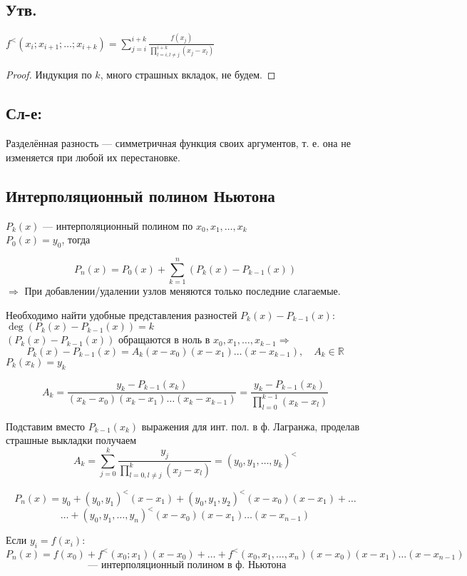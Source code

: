 \subsection*{Утв.}
$f^{<}(x_i; x_{i+1}; \ldots; x_{i+k}) = \sum_{j=i}^{i+k} \frac{f(x_j)}{\prod_{l = i, l \neq j}^{i+k} (x_j - x_l)}$

\begin{proof}
Индукция по $k$, много страшных вкладок, не будем.
\end{proof}

\subsection*{Сл-е:}
Разделённая разность --- симметричная функция своих аргументов, т. е. она не изменяется при любой их перестановке.

\subsection*{Интерполяционный полином Ньютона}

$P_k(x)$ --- интерполяционный полином по $x_0, x_1, \ldots, x_k$ \\
$P_0(x) = y_0$, тогда

\[
P_n(x) = P_0(x) + \sum_{k=1}^n ( P_k(x) - P_{k-1}(x))
\]
$\Rightarrow$ При добавлении/удалении узлов меняются только последние слагаемые.

Необходимо найти удобные представления разностей $P_k(x) - P_{k-1}(x)$: \\
$\deg \left( P_k(x) - P_{k-1}(x) \right) = k$ \\
$(P_k(x) - P_{k-1}(x))$ обращаются в ноль в $x_0, x_1, \ldots, x_{k-1} \Rightarrow$
\[
P_k(x) - P_{k-1}(x) = A_k (x - x_0)(x - x_1) \ldots (x - x_{k-1}), \quad A_k \in \mathbb{R}
\]
$P_k(x_k) = y_k$

\[
A_k = \frac{y_k - P_{k-1}(x_k)}{(x_k - x_0)(x_k - x_1) \ldots (x_k - x_{k-1})} = \frac{y_k - P_{k-1}(x_k)}{\prod_{l=0}^{k-1} (x_k - x_l)}
\]

Подставим вместо $P_{k-1}(x_k)$ выражения для инт. пол. в ф. Лагранжа, проделав страшные выкладки получаем
\[
A_k = \sum_{j=0}^k \frac{y_j}{\prod_{l=0, l \neq j}^k (x_j - x_l)} = (y_0,y_1, \ldots, y_k)^{<}
\]

\[
P_n(x) = y_0 + (y_0, y_1)^{<}(x-x_1) + (y_0,y_1,y_2)^{<}(x - x_0)(x - x_1) + \ldots
\]
\[
\ldots + (y_0, y_1, \ldots, y_n)^{<}(x - x_0)(x - x_1) \ldots (x - x_{n-1})
\]

Если $y_i = f(x_i)$:
\[
P_n(x) = f(x_0) + f^{<}(x_0; x_1)(x - x_0) + \ldots + f^{<}(x_0, x_1, \ldots, x_n)(x - x_0)(x - x_1) \ldots (x - x_{n-1})
\]
\[
 \text{ --- интерполяционный полином в ф. Ньютона}
\]

